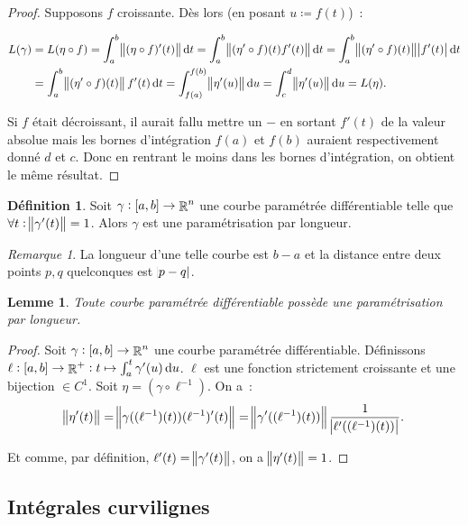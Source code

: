 \documentclass{article}
\DeclareMathOperator{\R}{\mathbb R}
\newcommand{\ab}{\interval ab}
\newtheorem{lem}[thm]{Lemme}
\theoremstyle{definition}
\newtheorem{déf}[thm]{Définition}
\theoremstyle{remark}
\newtheorem*{rmq}{Remarque}
\begin{document}
		\begin{proof} Supposons $f$ croissante. Dès lors (en posant $u \coloneqq f(t)$)~:

		\begin{align*}
			L(\gamma) &= L(\eta \circ f) = \int_a^b\norm{(\eta \circ f)'(t)}\dif t = \int_a^b\norm{(\eta' \circ f)(t)f'(t)}\dif t =
			\int_a^b\norm{(\eta' \circ f)(t)}\abs{f'(t)}\dif t \\
			          &= \int_a^b\norm{(\eta' \circ f)(t)}f'(t)\dif t = \int_{f(a)}^{f(b)}\norm{\eta'(u)}\dif u = \int_c^d\norm{\eta'(u)}\dif u = L(\eta).
		\end{align*}
		
		Si $f$ était décroissant, il aurait fallu mettre un $-$ en sortant $f'(t)$ de la valeur absolue mais les bornes d'intégration $f(a)$ et $f(b)$ auraient
		respectivement donné $d$ et $c$. Donc en rentrant le moins dans les bornes d'intégration, on obtient le même résultat. \end{proof}

		\begin{déf} Soit $\gamma : \ab \to \R^n$ une courbe paramétrée différentiable telle que $\forall t : \norm{\gamma'(t)} = 1$. Alors $\gamma$
		est une paramétrisation par longueur. \end{déf}

		\begin{rmq} La longueur d'une telle courbe est $b-a$ et la distance entre deux points $p, q$ quelconques est $\abs{p-q}$. \end{rmq}

		\begin{lem} Toute courbe paramétrée différentiable possède une paramétrisation par longueur. \end{lem}

		\begin{proof} Soit $\gamma : \ab \to \R^n$ une courbe paramétrée différentiable. Définissons $\ell : \ab \to \R^+ : t \mapsto \int_a^t\gamma'(u)\dif u$.
		$\ell$ est une fonction strictement croissante et une bijection $\in C^1$. Soit $\eta = (\gamma \circ \ell^{-1})$. On a~:
		\[\norm{\eta'(t)} = \norm{\gamma((\ell^{-1})(t))(\ell^{-1})'(t)} = \norm {\gamma'((\ell^{-1})(t))} \frac 1{\abs{\ell'((\ell^{-1})(t))}}.\]

		Et comme, par définition, $\ell'(t) = \norm{\gamma'(t)}$, on a $\norm{\eta'(t)} = 1$. \end{proof}

	\subsection{Intégrales curvilignes}
		
\end{document}
